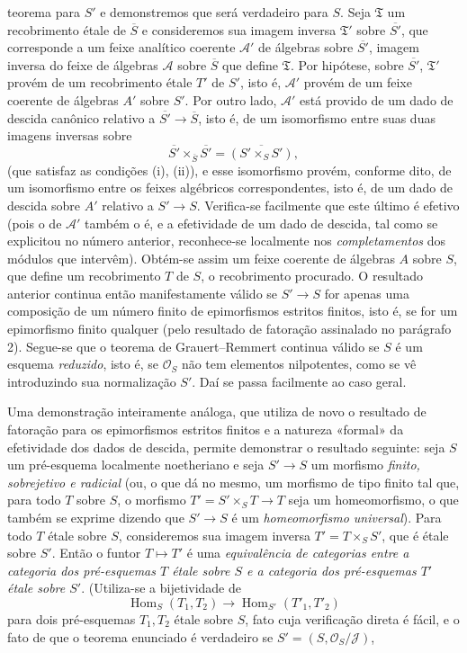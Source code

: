 \documentclass[11pt,twoside,openany]{book}
\numberwithin{equation}{section}
\newcommand{\src}[1]{%
  \phantomsection\hypertarget{src:#1}{}%
  \marginpar{\raggedleft\footnotesize\sffamily #1}%
}
\theoremstyle{plain}
\theoremstyle{definition}
\theoremstyle{remark}
\newcommand{\FgaUnitKey}{frontmatter}
\renewcommand{\src}[1]{%
  \phantomsection\hypertarget{src:\FgaUnitKey:#1}{}%
  \marginpar{\raggedleft\footnotesize\sffamily #1}%
}
\begin{document}
\src{309}
teorema para $S'$ e demonstremos que será verdadeiro para $S$. Seja
$\mathfrak T$ um recobrimento étale de $\overline S$ e consideremos sua imagem
inversa $\mathfrak T'$ sobre $\overline{S'}$, que corresponde a um feixe
analítico coerente $\mathcal A'$ de álgebras sobre $\overline{S'}$, imagem
inversa do feixe de álgebras $\mathcal A$ sobre $\overline S$ que define
$\mathfrak T$. Por hipótese, sobre $\overline{S'}$, $\mathfrak T'$ provém de
um recobrimento étale $T'$ de $S'$, isto é, $\mathcal A'$ provém de um feixe
coerente de álgebras $A'$ sobre $S'$. Por outro lado, $\mathcal A'$ está
provido de um dado de descida canônico relativo a
$\overline{S'}\longrightarrow\overline S$, isto é, de um isomorfismo entre
suas duas imagens inversas sobre
\[
  \overline{S'}\times_{\overline S}\overline{S'}
  =\overline{(S'\times_SS')},
\]
(que satisfaz as condições (i), (ii)), e esse isomorfismo provém, conforme
dito, de um isomorfismo entre os feixes algébricos correspondentes, isto é,
de um dado de descida sobre $A'$ relativo a
$S'\longrightarrow S$. Verifica-se facilmente que este último é efetivo
(pois o de $\mathcal A'$ também o é, e a efetividade de um dado de descida,
tal como se explicitou no número anterior, reconhece-se localmente nos
\emph{completamentos} dos módulos que intervêm). Obtém-se assim um feixe
coerente de álgebras $A$ sobre $S$, que define um recobrimento $T$ de $S$,
o recobrimento procurado. O resultado anterior continua então manifestamente
válido se $S'\longrightarrow S$ for apenas uma composição de um número finito
de epimorfismos estritos finitos, isto é, se for um epimorfismo finito
qualquer (pelo resultado de fatoração assinalado no parágrafo 2). Segue-se que
o teorema de Grauert--Remmert continua válido se $S$ é um esquema
\emph{reduzido}, isto é, se $\mathcal O_S$ não tem elementos nilpotentes, como
se vê introduzindo sua normalização $S'$. Daí se passa facilmente ao caso geral.

Uma demonstração inteiramente análoga, que utiliza de novo o resultado de
fatoração para os epimorfismos estritos finitos e a natureza «formal» da
efetividade dos dados de descida, permite demonstrar o resultado seguinte:
seja $S$ um pré-esquema localmente noetheriano e seja
$S'\longrightarrow S$ um morfismo \emph{finito, sobrejetivo e radicial} (ou,
o que dá no mesmo, um morfismo de tipo finito tal que, para todo $T$
sobre $S$, o morfismo $T'=S'\times_ST\longrightarrow T$ seja um homeomorfismo,
o que também se exprime dizendo que $S'\longrightarrow S$ é um
\emph{homeomorfismo universal}). Para todo $T$ étale sobre $S$, consideremos
sua imagem inversa $T'=T\times_SS'$, que é étale sobre $S'$. Então o
funtor $T\longmapsto T'$ é uma \emph{equivalência de categorias entre a
categoria dos pré-esquemas $T$ étale sobre $S$ e a categoria dos
pré-esquemas $T'$ étale sobre $S'$}. (Utiliza-se a bijetividade de
\[
  \operatorname{Hom}_S(T_1,T_2)\longrightarrow
  \operatorname{Hom}_{S'}(T'_1,T'_2)
\]
para dois pré-esquemas $T_1,T_2$ étale sobre $S$, fato cuja verificação direta
é fácil, e o fato de que o teorema enunciado é verdadeiro se
$S'=(S,\mathcal O_S/\mathcal J)$,
\end{document}
